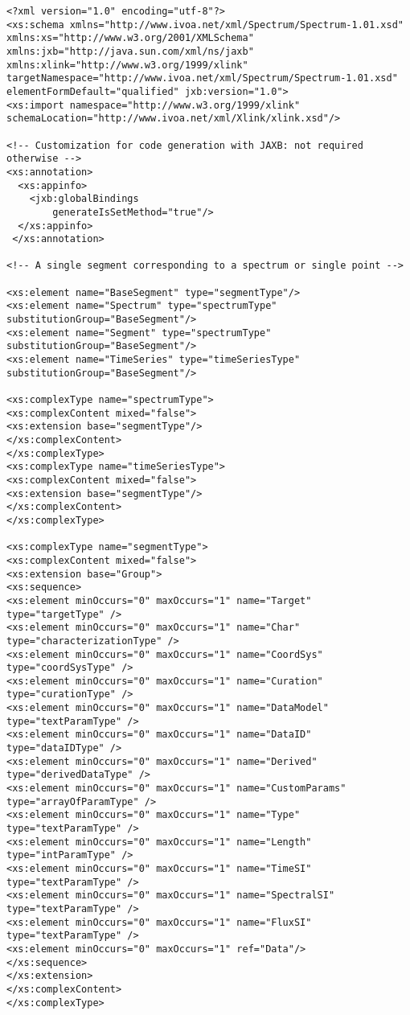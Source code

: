 { \footnotesize
\begin{flushleft}

\begin{fmppage}


\begin{verbatim}
<?xml version="1.0" encoding="utf-8"?>
<xs:schema xmlns="http://www.ivoa.net/xml/Spectrum/Spectrum-1.01.xsd"
xmlns:xs="http://www.w3.org/2001/XMLSchema"
xmlns:jxb="http://java.sun.com/xml/ns/jaxb"
xmlns:xlink="http://www.w3.org/1999/xlink"
targetNamespace="http://www.ivoa.net/xml/Spectrum/Spectrum-1.01.xsd"
elementFormDefault="qualified" jxb:version="1.0">
<xs:import namespace="http://www.w3.org/1999/xlink" schemaLocation="http://www.ivoa.net/xml/Xlink/xlink.xsd"/>

<!-- Customization for code generation with JAXB: not required otherwise -->
<xs:annotation>
  <xs:appinfo>
    <jxb:globalBindings
        generateIsSetMethod="true"/>
  </xs:appinfo>
 </xs:annotation>

<!-- A single segment corresponding to a spectrum or single point -->

<xs:element name="BaseSegment" type="segmentType"/>
<xs:element name="Spectrum" type="spectrumType" substitutionGroup="BaseSegment"/>
<xs:element name="Segment" type="spectrumType" substitutionGroup="BaseSegment"/>
<xs:element name="TimeSeries" type="timeSeriesType" substitutionGroup="BaseSegment"/>

<xs:complexType name="spectrumType">
<xs:complexContent mixed="false">
<xs:extension base="segmentType"/>
</xs:complexContent>
</xs:complexType>
<xs:complexType name="timeSeriesType">
<xs:complexContent mixed="false">
<xs:extension base="segmentType"/>
</xs:complexContent>
</xs:complexType>

<xs:complexType name="segmentType">
<xs:complexContent mixed="false">
<xs:extension base="Group">
<xs:sequence>
<xs:element minOccurs="0" maxOccurs="1" name="Target" type="targetType" />
<xs:element minOccurs="0" maxOccurs="1" name="Char" type="characterizationType" />
<xs:element minOccurs="0" maxOccurs="1" name="CoordSys" type="coordSysType" />
<xs:element minOccurs="0" maxOccurs="1" name="Curation" type="curationType" />
<xs:element minOccurs="0" maxOccurs="1" name="DataModel" type="textParamType" />
<xs:element minOccurs="0" maxOccurs="1" name="DataID" type="dataIDType" />
<xs:element minOccurs="0" maxOccurs="1" name="Derived" type="derivedDataType" />
<xs:element minOccurs="0" maxOccurs="1" name="CustomParams" type="arrayOfParamType" />
<xs:element minOccurs="0" maxOccurs="1" name="Type" type="textParamType" />
<xs:element minOccurs="0" maxOccurs="1" name="Length" type="intParamType" />
<xs:element minOccurs="0" maxOccurs="1" name="TimeSI" type="textParamType" />
<xs:element minOccurs="0" maxOccurs="1" name="SpectralSI" type="textParamType" />
<xs:element minOccurs="0" maxOccurs="1" name="FluxSI" type="textParamType" />
<xs:element minOccurs="0" maxOccurs="1" ref="Data"/>
</xs:sequence>
</xs:extension>
</xs:complexContent>
</xs:complexType>


\end{verbatim}
\end{fmppage}
\end{flushleft}}
